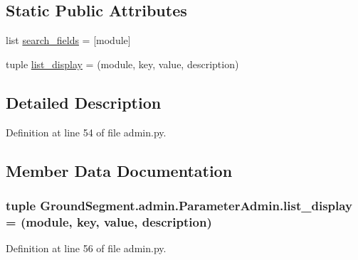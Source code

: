 \subsection*{Static Public Attributes}
\begin{DoxyCompactItemize}
\item 
list \hyperlink{class_ground_segment_1_1admin_1_1_parameter_admin_aa50da80cc9ee5d5dcbad140ad78d5cf7}{search\+\_\+fields} = \mbox{[}\textquotesingle{}module\textquotesingle{}\mbox{]}
\item 
tuple \hyperlink{class_ground_segment_1_1admin_1_1_parameter_admin_ace74aa316d4bd8e2fa1737dc689fcde3}{list\+\_\+display} = (\textquotesingle{}module\textquotesingle{}, \textquotesingle{}key\textquotesingle{}, \textquotesingle{}value\textquotesingle{}, \textquotesingle{}description\textquotesingle{})
\end{DoxyCompactItemize}


\subsection{Detailed Description}


Definition at line 54 of file admin.\+py.



\subsection{Member Data Documentation}
\hypertarget{class_ground_segment_1_1admin_1_1_parameter_admin_ace74aa316d4bd8e2fa1737dc689fcde3}{}
\subsubsection[{list\+\_\+display}]{\setlength{\rightskip}{0pt plus 5cm}tuple Ground\+Segment.\+admin.\+Parameter\+Admin.\+list\+\_\+display = (\textquotesingle{}module\textquotesingle{}, \textquotesingle{}key\textquotesingle{}, \textquotesingle{}value\textquotesingle{}, \textquotesingle{}description\textquotesingle{})\hspace{0.3cm}{\ttfamily [static]}}\label{class_ground_segment_1_1admin_1_1_parameter_admin_ace74aa316d4bd8e2fa1737dc689fcde3}


Definition at line 56 of file admin.\+py.

